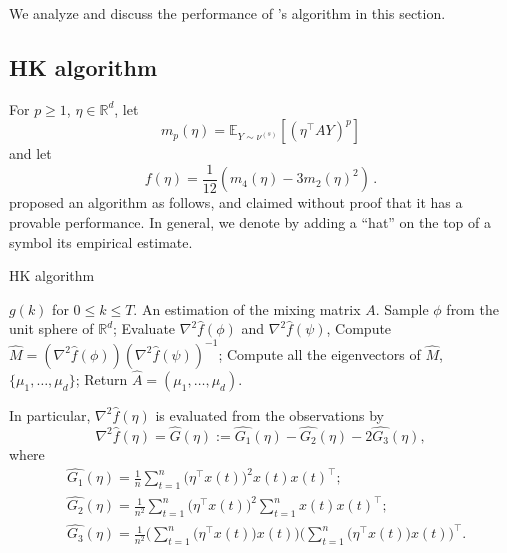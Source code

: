 \documentclass[twoside]{article}
\newcommand{\E}{\mathbb{E}}
\newcommand{\real}{\mathbb{R}}
\theoremstyle{definition}
\begin{document}
We analyze and discuss the performance of \citet{hsu2013learning}'s algorithm in this section.

\subsection{ HK algorithm}
\label{subsec:HKalg}
For $p\ge 1$, $\eta\in \real^d$, 
let 
\[
m_p(\eta) = \E_{Y\sim \nu^{(s)}}[ (\eta^\top A Y)^p ]
\]
 and let
\[
f(\eta) = \frac1{12} \left( m_4(\eta) - 3 m_2(\eta)^2 \right)\,.
\]
\citet{DHsu2012} proposed an algorithm as follows, and claimed without proof that it has a provable performance. 
In general, we denote by adding a ``hat'' on the top of a symbol its empirical estimate.
\begin{algorithm}[H]
\caption{HK algorithm}
\begin{algorithmic}[1]
\INPUT $g(k)$ for $0\le k \le T$. 
\OUTPUT An estimation of the mixing matrix $A$. 
\STATE Sample $\phi$ from the unit sphere of $\real^d$;
\STATE Evaluate $\nabla^2\widehat{f}(\phi)$ and $\nabla^2\widehat{f}(\psi)$, 
\STATE Compute $\widehat{M} = (\nabla^2 \widehat{f}(\phi))(\nabla^2\widehat{f}(\psi))^{-1}$;
\STATE Compute all the eigenvectors of $\widehat{M}$, $\{\mu_1,\ldots,\mu_d\}$;
\STATE Return $\widehat{A} = (\mu_1,\ldots,\mu_d)$.
\end{algorithmic}
\end{algorithm}
In particular, $\nabla^2\widehat{f}(\eta)$  is evaluated from the observations by
\[
\nabla^2 \widehat{f}(\eta) = \widehat{G}(\eta):= \widehat{G_1}(\eta) - \widehat{G_2}(\eta) -2\widehat{G_3}(\eta),
\]
where 
\begin{align*}
&\widehat{ G_1}(\eta) = \frac1n\sum_{t=1}^{n} \big(\eta^{\top}x(t)\big)^2x(t)x(t)^{\top}; \\
& \widehat{G_2}(\eta) = \frac{1}{n^2}\sum_{t=1}^{n} \big(\eta^{\top}x(t)\big)^2 \sum_{t=1}^{n}x(t)x(t)^{\top}; \\
& \widehat{G_3}(\eta) = \frac{1}{n^2}\Big(\sum_{t=1}^{n} \big(\eta^{\top}x(t)\big)x(t)\Big) \Big(\sum_{t=1}^{n} \big(\eta^{\top}x(t)\big)x(t)\Big)^{\top}.
\end{align*} 
\end{document}
